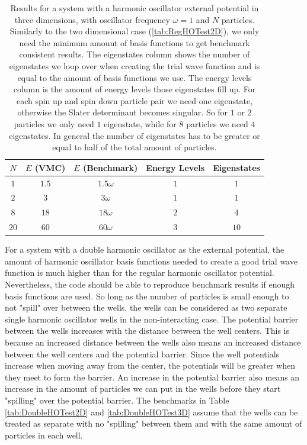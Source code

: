 \documentclass[../main.tex]{subfiles}
\begin{document}
\begin{table}[!ht]
  \centering
  \begin{tabular}{ | c | c | c | c | c | }
    \hline
    $N$ & $E$ (VMC) & $E$ (Benchmark) &  Energy Levels & Eigenstates\\*
    \hline
    $1$ & $1.5$ & $1.5\omega$ & $1$ & $1$ \\*
    \hline
    $2$ & $3$ & $3\omega$ & $1$ & $1$ \\*
    \hline
    $8$ & $18$ & $18\omega$ & $2$ & $4$ \\*
    \hline
    $20$ & $60$ & $60\omega$ & $3$ & $10$ \\*
    \hline
  \end{tabular}
  \caption{Results for a system with a harmonic oscillator external potential in three dimensions, with oscillator frequency $\omega = 1$ and $N$ particles. Similarly to the two dimensional case (\ref{tab:RegHOTest2D}), we only need the minimum amount of basis functions to get benchmark consistent results. The eigenstates column shows the number of eigenstates we loop over when creating the trial wave function and is equal to the amount of basis functions we use. The energy levels column is the amount of energy levels those eigenstates fill up. For each spin up and spin down particle pair we need one eigenstate, otherwise the Slater determinant becomes singular. So for $1$ or $2$ particles we only need $1$ eigenstate, while for $8$ particles we need $4$ eigenstates. In general the number of eigenstates has to be greater or equal to half of the total amount of particles.}
  \label{tab:RegHOTest3D}
\end{table}

For a system with a double harmonic oscillator as the external potential, the amount of harmonic oscillator basis functions needed to create a good trial wave function is much higher than for the regular harmonic oscillator potential. Nevertheless, the code should be able to reproduce benchmark results if enough basis functions are used. So long as the number of particles is small enough to not "spill" over between the wells, the wells can be considered as two separate single harmonic oscillator wells in the non-interacting case. The potential barrier between the wells increases with the distance between the well centers. This is because an increased distance between the wells also means an increased distance between the well centers and the potential barrier. Since the well potentials increase when moving away from the center, the potentials will be greater when they meet to form the barrier. An increase in the potential barrier also means an increase in the amount of particles we can put in the wells before they start "spilling" over the potential barrier. The benchmarks in Table \ref{tab:DoubleHOTest2D} and \ref{tab:DoubleHOTest3D} assume that the wells can be treated as separate with no "spilling" between them and with the same amount of particles in each well. 
\end{document}
